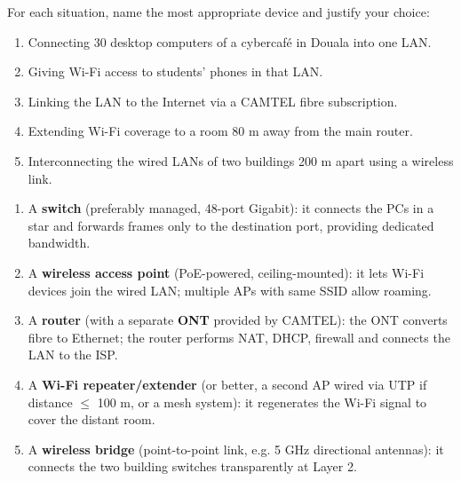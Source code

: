 \documentclass[11pt]{article}
\begin{document}
\begin{exercice}
For each situation, name the most appropriate device and justify your choice:
\begin{enumerate}
\item Connecting 30 desktop computers of a cybercafé in Douala into one LAN.
\item Giving Wi-Fi access to students' phones in that LAN.
\item Linking the LAN to the Internet via a CAMTEL fibre subscription.
\item Extending Wi-Fi coverage to a room 80 m away from the main router.
\item Interconnecting the wired LANs of two buildings 200 m apart using a wireless link.
\end{enumerate}
\end{exercice}

\begin{corrige}[Exercise 1]
\begin{enumerate}
\item A \textbf{switch} (preferably managed, 48-port Gigabit): it connects the PCs in a star and forwards frames only to the destination port, providing dedicated bandwidth.
\item A \textbf{wireless access point} (PoE-powered, ceiling-mounted): it lets Wi-Fi devices join the wired LAN; multiple APs with same SSID allow roaming.
\item A \textbf{router} (with a separate \textbf{ONT} provided by CAMTEL): the ONT converts fibre to Ethernet; the router performs NAT, DHCP, firewall and connects the LAN to the ISP.
\item A \textbf{Wi-Fi repeater/extender} (or better, a second AP wired via UTP if distance $\le$ 100 m, or a mesh system): it regenerates the Wi-Fi signal to cover the distant room.
\item A \textbf{wireless bridge} (point-to-point link, e.g. 5 GHz directional antennas): it connects the two building switches transparently at Layer 2.
\end{enumerate}
\end{corrige}
\end{document}
